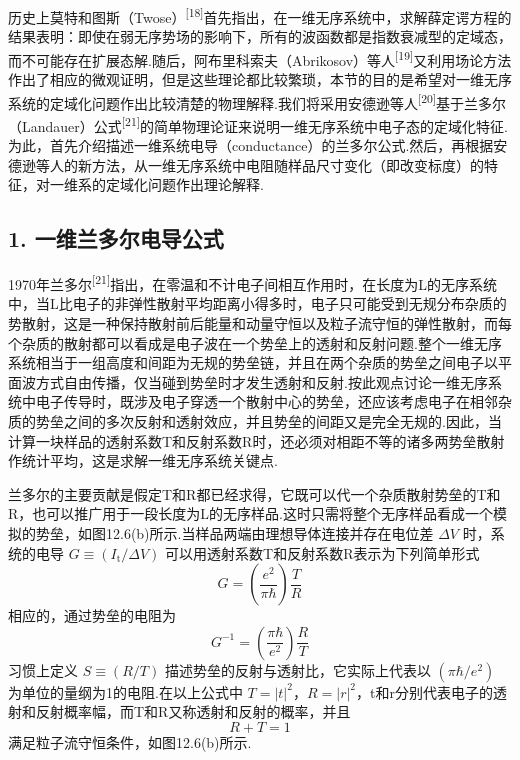 历史上莫特和图斯（Twose）\textsuperscript{[18]}首先指出，在一维无序系统中，求解薛定谔方程的结果表明：即使在弱无序势场的影响下，所有的波函数都是指数衰减型的定域态，而不可能存在扩展态解.随后，阿布里科索夫（Abrikosov）等人\textsuperscript{[19]}又利用场论方法作出了相应的微观证明，但是这些理论都比较繁琐，本节的目的是希望对一维无序系统的定域化问题作出比较清楚的物理解释.我们将采用安德逊等人\textsuperscript{[20]}基于兰多尔（Landauer）公式\textsuperscript{[21]}的简单物理论证来说明一维无序系统中电子态的定域化特征.为此，首先介绍描述一维系统电导（conductance）的兰多尔公式.然后，再根据安德逊等人的新方法，从一维无序系统中电阻随样品尺寸变化（即改变标度）的特征，对一维系的定域化问题作出理论解释.

\subsection*{1. 一维兰多尔电导公式}

1970年兰多尔\textsuperscript{[21]}指出，在零温和不计电子间相互作用时，在长度为L的无序系统中，当L比电子的非弹性散射平均距离小得多时，电子只可能受到无规分布杂质的势散射，这是一种保持散射前后能量和动量守恒以及粒子流守恒的弹性散射，而每个杂质的散射都可以看成是电子波在一个势垒上的透射和反射问题.整个一维无序系统相当于一组高度和间距为无规的势垒链，并且在两个杂质的势垒之间电子以平面波方式自由传播，仅当碰到势垒时才发生透射和反射.按此观点讨论一维无序系统中电子传导时，既涉及电子穿透一个散射中心的势垒，还应该考虑电子在相邻杂质的势垒之间的多次反射和透射效应，并且势垒的间距又是完全无规的.因此，当计算一块样品的透射系数T和反射系数R时，还必须对相距不等的诸多两势垒散射作统计平均，这是求解一维无序系统关键点.

兰多尔的主要贡献是假定T和R都已经求得，它既可以代一个杂质散射势垒的T和R，也可以推广用于一段长度为L的无序样品.这时只需将整个无序样品看成一个模拟的势垒，如图12.6(b)所示.当样品两端由理想导体连接并存在电位差 $\Delta V$ 时，系统的电导 $G\equiv\left(I_{\mathrm{t}}/\Delta V\right)$ 可以用透射系数T和反射系数R表示为下列简单形式
\begin{equation}
  G=\left(\frac{e^{2}}{\pi\hbar}\right)\frac{T}{R}
\end{equation}
相应的，通过势垒的电阻为
\begin{equation}
  G^{-1}=\left(\frac{\pi\hbar}{e^{2}}\right)\frac{R}{T}
\end{equation}
习惯上定义 $S\equiv\left(R/T\right)$ 描述势垒的反射与透射比，它实际上代表以 $\left(\pi\hbar/e^{2}\right)$ 为单位的量纲为1的电阻.在以上公式中 $T=|t|^{2}$，$R=|r|^{2}$，t和r分别代表电子的透射和反射概率幅，而T和R又称透射和反射的概率，并且
\begin{equation}
  R+T=1
\end{equation}
满足粒子流守恒条件，如图12.6(b)所示.

